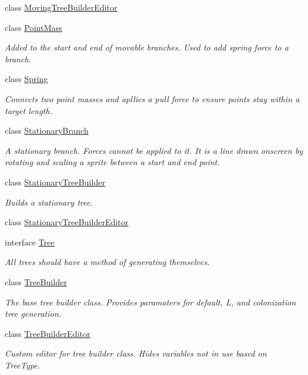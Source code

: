 \begin{DoxyCompactItemize}
class \hyperlink{class_fractal_tree_1_1_moving_tree_builder_editor}{Moving\+Tree\+Builder\+Editor}
\item 
class \hyperlink{class_fractal_tree_1_1_point_mass}{Point\+Mass}
\begin{DoxyCompactList}\small\item\em Added to the start and end of movable branches. Used to add spring force to a branch. \end{DoxyCompactList}\item 
class \hyperlink{class_fractal_tree_1_1_spring}{Spring}
\begin{DoxyCompactList}\small\item\em Connects two point masses and apllies a pull force to ensure points stay within a target length. \end{DoxyCompactList}\item 
class \hyperlink{class_fractal_tree_1_1_stationary_branch}{Stationary\+Branch}
\begin{DoxyCompactList}\small\item\em A stationary branch. Forces cannot be applied to it. It is a line drawn onscreen by rotating and scaling a sprite between a start and end point. \end{DoxyCompactList}\item 
class \hyperlink{class_fractal_tree_1_1_stationary_tree_builder}{Stationary\+Tree\+Builder}
\begin{DoxyCompactList}\small\item\em Builds a stationary tree. \end{DoxyCompactList}\item 
class \hyperlink{class_fractal_tree_1_1_stationary_tree_builder_editor}{Stationary\+Tree\+Builder\+Editor}
\item 
interface \hyperlink{interface_fractal_tree_1_1_tree}{Tree}
\begin{DoxyCompactList}\small\item\em All trees should have a method of generating themselves. \end{DoxyCompactList}\item 
class \hyperlink{class_fractal_tree_1_1_tree_builder}{Tree\+Builder}
\begin{DoxyCompactList}\small\item\em The base tree builder class. Provides paramaters for default, L, and colonization tree generation. \end{DoxyCompactList}\item 
class \hyperlink{class_fractal_tree_1_1_tree_builder_editor}{Tree\+Builder\+Editor}
\begin{DoxyCompactList}\small\item\em Custom editor for tree builder class. Hides variables not in use based on Tree\+Type. \end{DoxyCompactList}\end{DoxyCompactItemize}
